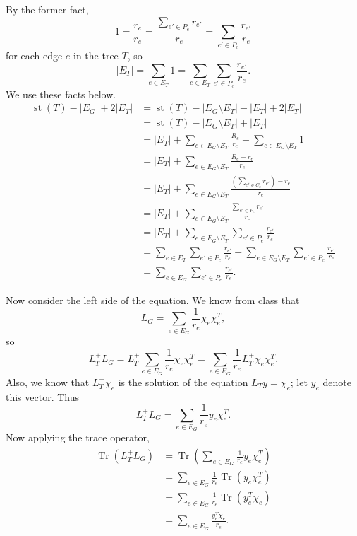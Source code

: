 \documentclass{article}
\newcommand{\0}{\mathbf{0}}
\DeclareMathOperator{\st}{st}
\DeclareMathOperator{\Tr}{Tr}
\begin{document}
\begin{enumerate}
\begin{enumerate}
    By the former fact,
    \begin{equation*}
      1 = \frac{r_e}{r_e} = \frac{\sum_{e' \in P_e} r_{e'}}{r_e} = \sum_{e' \in P_e} \frac{r_{e'}}{r_e}
    \end{equation*}
    for each edge $e$ in the tree $T$, so
    \begin{equation*}
      |E_T| = \sum_{e \in E_T} 1 = \sum_{e \in E_T} \sum_{e' \in P_e} \frac{r_{e'}}{r_e}.
    \end{equation*}
    We use these facts below.
    \begin{align*}
      \st(T) - |E_G| + 2 |E_T| & = \st(T) - |E_G \setminus E_T| - |E_T| + 2 |E_T| \\
      & = \st(T) - |E_G \setminus E_T| + |E_T| \\
      & = |E_T| + \sum_{e \in E_G \setminus E_T} \frac{R_e}{r_e} - \sum_{e \in E_G \setminus E_T} 1 \\
      & = |E_T| + \sum_{e \in E_G \setminus E_T} \frac{R_e - r_e}{r_e} \\
      & = |E_T| + \sum_{e \in E_G \setminus E_T} \frac{\left(\sum_{e' \in C_e} r_{e'}\right) - r_e}{r_e} \\
      & = |E_T| + \sum_{e \in E_G \setminus E_T} \frac{\sum_{e' \in P_e} r_{e'}}{r_e} \\
      & = |E_T| + \sum_{e \in E_G \setminus E_T} \sum_{e' \in P_e} \frac{r_{e'}}{r_e} \\
      & = \sum_{e \in E_T} \sum_{e' \in P_e} \frac{r_{e'}}{r_e} + \sum_{e \in E_G \setminus E_T} \sum_{e' \in P_e} \frac{r_{e'}}{r_e} \\
      & = \sum_{e \in E_G} \sum_{e' \in P_e} \frac{r_{e'}}{r_e}.
    \end{align*}

    Now consider the left side of the equation.
    We know from class that
    \begin{equation*}
      L_G = \sum_{e \in E_G} \frac{1}{r_e} \chi_e \chi_e^T,
    \end{equation*}
    so
    \begin{equation*}
      L_T^+ L_G = L_T^+ \sum_{e \in E_G} \frac{1}{r_e} \chi_e \chi_e^T = \sum_{e \in E_G} \frac{1}{r_e} L_T^+ \chi_e \chi_e^T.
    \end{equation*}
    Also, we know that $L_T^+ \chi_e$ is the solution of the equation $L_T y = \chi_e$; let $y_e$ denote this vector.
    Thus
    \begin{equation*}
      L_T^+ L_G = \sum_{e \in E_G} \frac{1}{r_e} y_e \chi_e^T.
    \end{equation*}
    Now applying the trace operator,
    \begin{align*}
      \Tr(L_T^+ L_G) & = \Tr\left(\sum_{e \in E_G} \frac{1}{r_e} y_e \chi_e^T\right) \\
      & = \sum_{e \in E_G} \frac{1}{r_e} \Tr(y_e \chi_e^T) \\
      & = \sum_{e \in E_G} \frac{1}{r_e} \Tr(y_e^T \chi_e) \\
      & = \sum_{e \in E_G} \frac{y_e^T \chi_e}{r_e}.
    \end{align*}


\end{enumerate}
\end{enumerate}
\end{document}

